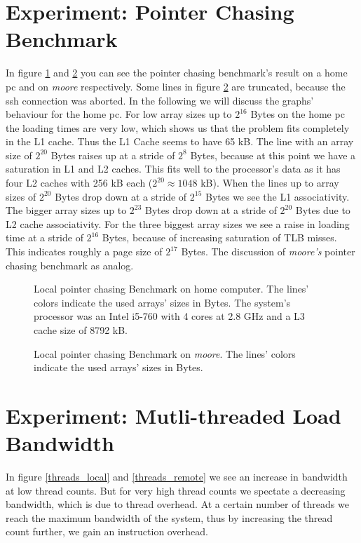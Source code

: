 \documentclass[DIV=12,oneside,a4paper]{scrartcl}
\begin{document}
\section{Experiment: Pointer Chasing Benchmark}
In figure \ref{pointer_chasing_local} and \ref{pointer_chasing_remote}
you can see the pointer chasing benchmark's result on a home pc and on \emph{moore}
respectively. Some lines in figure \ref{pointer_chasing_remote} are truncated, because
the ssh connection was aborted. In the following we will discuss the graphs' behaviour for
the home pc. For low array sizes up to $2^{16}$ Bytes on the home pc the loading times
are very low, which shows us that the problem fits completely in the L1 cache. Thus the
L1 Cache seems to have 65 kB. The line with an array size of $2^{20}$ Bytes raises
up at a stride of $2^8$ Bytes, because at this point we have a saturation in
L1 and L2 caches. This fits well to the processor's data as it has four
L2 caches with 256 kB each ($2^{20}\approx 1048$ kB). When the lines up to
array sizes of $2^20$ Bytes drop down at a stride of $2^15$ Bytes we see
the L1 associativity. The bigger array sizes up to $2^{23}$ Bytes drop
down at a stride of $2^{20}$ Bytes due to L2 cache associativity.
For the three biggest array sizes we see a raise in loading time at a stride of
$2^16$ Bytes, because of increasing saturation of TLB misses. This indicates roughly
a page size of $2^{17}$ Bytes. The discussion of \emph{moore's} pointer chasing benchmark
as analog.

\begin{figure}
	
	\label{pointer_chasing_local}
	\caption{Local pointer chasing Benchmark on home computer. The lines' colors indicate the
	         used arrays' sizes in Bytes. The system's processor was an Intel i5-760 with 
			 4 cores at 2.8 GHz and a L3 cache size of 8792 kB.}
\end{figure}
\begin{figure}
	
	\label{pointer_chasing_remote}
	\caption{Local pointer chasing Benchmark on \emph{moore}. The lines' colors indicate the
	         used arrays' sizes in Bytes.} 
\end{figure}

\section{Experiment: Mutli-threaded Load Bandwidth}

In figure \ref{threads_local} and \ref{threads_remote} we see 
an increase in bandwidth at low thread counts. But for very high
thread counts we spectate a decreasing bandwidth, which is due to
thread overhead. At a certain number of threads we reach the 
maximum bandwidth of the system, thus by increasing the 
thread count further, we gain an instruction overhead.
\end{document}
